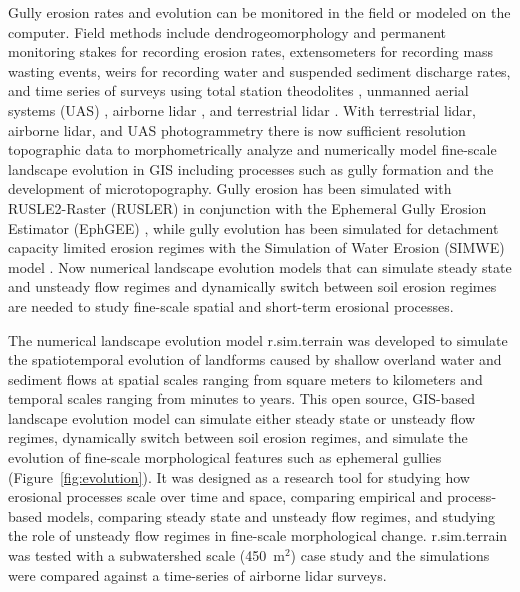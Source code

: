 \documentclass[gmd, manuscript]{copernicus}
\begin{document}
Gully erosion rates and evolution
can be monitored in the field 
or modeled on the computer. 
Field methods include
dendrogeomorphology \citep{Malik2008} and 
permanent monitoring stakes for recording erosion rates, 
extensometers for recording mass wasting events, 
weirs for recording water and suspended sediment discharge rates, 
and time series of surveys using 
total station theodolites \citep{Thomas2004},
unmanned aerial systems (UAS) \citep{Jeziorska2016,Kasprak2019,Yang2019},
airborne lidar \citep{Perroy2010,Starek2011}, 
and terrestrial lidar \citep{Starek2011,Bechet2016,Goodwin2016,Telling2017}.
With terrestrial lidar, airborne lidar, and 
UAS photogrammetry
there is now sufficient resolution topographic data 
to morphometrically analyze and 
numerically model fine-scale landscape evolution in GIS
including processes such as gully formation 
and the development of microtopography. 
Gully erosion has been simulated with 
RUSLE2-Raster (RUSLER)
in conjunction with the Ephemeral Gully Erosion Estimator (EphGEE)
\citep{Dabney2014},
while gully evolution
has been simulated for detachment capacity limited erosion regimes
with the Simulation of Water Erosion (SIMWE) model
\citep{Koco2011, Mitasova2013}. 
Now numerical landscape evolution models 
that can simulate 
steady state and unsteady flow regimes
and dynamically switch between soil erosion regimes 
are needed to study 
fine-scale spatial and short-term erosional processes.

The numerical landscape evolution model 
r.sim.terrain was developed to 
simulate the spatiotemporal evolution of landforms
caused by shallow overland water and sediment flows
at spatial scales ranging from
square meters to kilometers
and temporal scales ranging from minutes to years. 
This open source, GIS-based landscape evolution model can
simulate either steady state or unsteady flow regimes,
dynamically switch between soil erosion regimes, and
simulate the evolution of fine-scale morphological features 
such as ephemeral gullies
(Figure~\ref{fig:evolution}).
It was designed as a research tool for
studying how erosional processes scale over time and space,
comparing empirical and process-based models, 
comparing steady state and unsteady flow regimes, and
studying the role of unsteady flow regimes
in fine-scale morphological change. 
r.sim.terrain was tested with 
a subwatershed scale (450~\unit{m}$^{2}$) case study
and the simulations were compared against 
a time-series of airborne lidar surveys.
\end{document}
